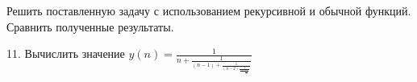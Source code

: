 Решить поставленную задачу с использованием рекурсивной и обычной
функций. Сравнить полученные результаты.

11. Вычислить значение $y(n) = \frac{1}{n+\frac{1}{(n-1)+\frac{1}{(n-2)\frac{1}{\frac{...}{...+\frac{1}{\frac{1}{2}}}}}}}$
